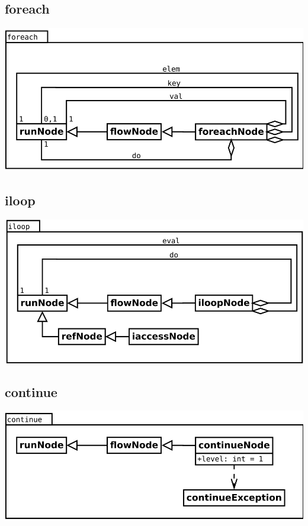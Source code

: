 \subsection{foreach}
\begin{center}
\includegraphics[scale=0.4]{foreach.png} \\
\end{center}

\subsection{iloop}
\begin{center}
\includegraphics[scale=0.4]{iloop.png} \\
\end{center}


\subsection{continue}
\begin{center}
\includegraphics[scale=0.4]{continue.png} \\
\end{center}

